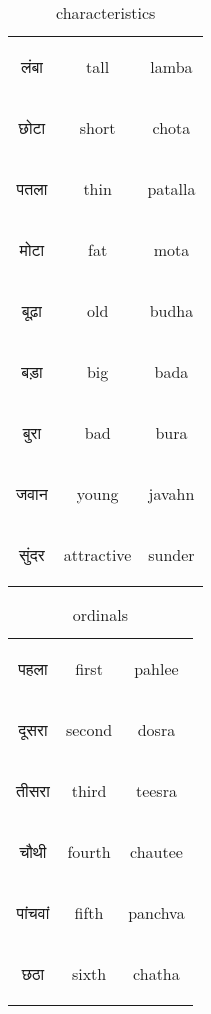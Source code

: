 \begin{table}[H]
    \centering
    \begin{tabular}{c|c|c}        
    \begin{hindi} लंबा  \end{hindi} & tall & lamba \\
    \begin{hindi} छोटा  \end{hindi} & short & chota \\
    \begin{hindi} पतला \end{hindi} & thin & patalla \\
    \begin{hindi} मोटा  \end{hindi} & fat & mota \\
    \begin{hindi} बूढ़ा  \end{hindi} & old & budha \\
    \begin{hindi} बड़ा  \end{hindi} & big & bada \\
    \begin{hindi} बुरा  \end{hindi} & bad & bura \\
    \begin{hindi} जवान \end{hindi} & young & javahn \\
    \begin{hindi} सुंदर   \end{hindi} & attractive & sunder \\
    \end{tabular}
    \caption{characteristics}
    \label{tab:adjectives_colors}
\end{table}


\begin{table}[H]
    \centering
    \begin{tabular}{c|c|c}        
    \begin{hindi} पहला \end{hindi} & first & pahlee \\
    \begin{hindi} दूसरा  \end{hindi} & second & dosra \\
    \begin{hindi} तीसरा \end{hindi} & third & teesra \\
    \begin{hindi} चौथी  \end{hindi} & fourth & chautee \\
    \begin{hindi} पांचवां \end{hindi} & fifth & panchva \\
    \begin{hindi} छठा \end{hindi} & sixth & chatha \\
    \end{tabular}
    \caption{ordinals}
    \label{tab:adjectives_ordinals}
\end{table}

